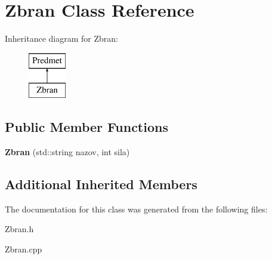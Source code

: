 \hypertarget{class_zbran}{\section{Zbran Class Reference}
\label{class_zbran}
}
Inheritance diagram for Zbran\-:\begin{figure}[H]
\begin{center}
\leavevmode
\includegraphics[height=2.000000cm]{class_zbran}
\end{center}
\end{figure}
\subsection*{Public Member Functions}
\begin{DoxyCompactItemize}
\item 
\hypertarget{class_zbran_a5f5db62ac980f4c15e3541d8a67de9b5}{{\bfseries Zbran} (std\-::string nazov, int sila)}\label{class_zbran_a5f5db62ac980f4c15e3541d8a67de9b5}

\end{DoxyCompactItemize}
\subsection*{Additional Inherited Members}


The documentation for this class was generated from the following files\-:\begin{DoxyCompactItemize}
\item 
Zbran.\-h\item 
Zbran.\-cpp\end{DoxyCompactItemize}
